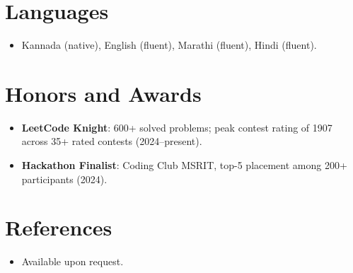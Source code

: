 \documentclass[11pt,a4paper,sans]{moderncv}
\begin{document}
\section{Languages}
\vspace{1pt}
\begin{itemize}
\item {Kannada (native), English (fluent), Marathi (fluent), Hindi (fluent).}
\end{itemize}

\section{Honors and Awards}
\vspace{1pt}
\begin{itemize}
\item {\textbf{LeetCode Knight}: 600+ solved problems; peak contest rating of 1907 across 35+ rated contests (2024--present).}
\item {\textbf{Hackathon Finalist}: Coding Club MSRIT, top-5 placement among 200+ participants (2024).}
\end{itemize}

\section{References}
\vspace{1pt}
\begin{itemize}
\item {Available upon request.}
\end{itemize}
\end{document}
